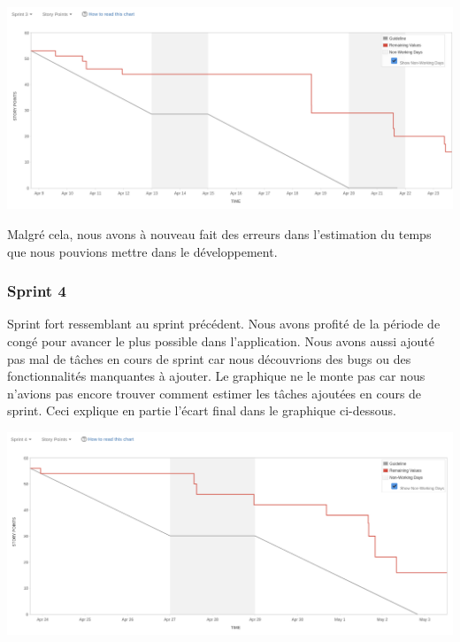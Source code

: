 \documentclass[t, 12pt, usenames,dvipsnames]{article}
\begin{document}
                \begin{center}
                    \includegraphics[scale=.25]{images/graph-new/sprint3.png}
                    \label{fig:sprint3_graph}
                \end{center}
                
                \noindent Malgré cela, nous avons à nouveau fait des erreurs dans l'estimation du temps que nous pouvions mettre dans le développement.
                
                
            \subsubsection{Sprint 4}
                \noindent Sprint fort ressemblant au sprint précédent. Nous avons profité de la période de congé pour avancer le plus possible dans l'application. Nous avons aussi ajouté pas mal de tâches en cours de sprint car nous découvrions des bugs ou des fonctionnalités manquantes à ajouter. Le graphique ne le monte pas car nous n'avions pas encore trouver comment estimer les tâches ajoutées en cours de sprint.
                Ceci explique en partie l'écart final dans le graphique ci-dessous.
                
                \begin{center}
                    \includegraphics[scale=.25]{images/graph-new/sprint4.png}
                    \label{fig:sprint4_graph}
                \end{center}
        
\end{document}

